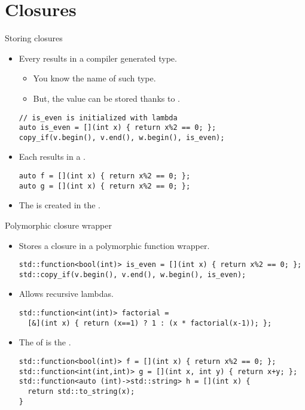 \section{Closures}

\begin{frame}[t,fragile]{Storing closures}
  \begin{itemize}
    \item Every  results in
          a  compiler generated type.
      \begin{itemize}
        \item You  know the name of such type.
        \item But, the value can be stored thanks to .
      \end{itemize}
\begin{lstlisting}
// is_even is initialized with lambda
auto is_even = [](int x) { return x%2 == 0; }; 
copy_if(v.begin(), v.end(), w.begin(), is_even);
\end{lstlisting}

    \item Each  results in a .
\begin{lstlisting}
auto f = [](int x) { return x%2 == 0; };
auto g = [](int x) { return x%2 == 0; };
\end{lstlisting}

    \item The  is created in the .
  \end{itemize}
\end{frame}

\begin{frame}[t,fragile]{Polymorphic closure wrapper}
  \begin{itemize}
    \item Stores a closure in a polymorphic function wrapper.
\begin{lstlisting}
std::function<bool(int)> is_even = [](int x) { return x%2 == 0; };
std::copy_if(v.begin(), v.end(), w.begin(), is_even);
\end{lstlisting}

    \item Allows recursive lambdas.
\begin{lstlisting}
std::function<int(int)> factorial = 
  [&](int x) { return (x==1) ? 1 : (x * factorial(x-1)); };
\end{lstlisting}

    \item The  of  
          is the .
\begin{lstlisting}
std::function<bool(int)> f = [](int x) { return x%2 == 0; };
std::function<int(int,int)> g = [](int x, int y) { return x+y; };
std::function<auto (int)->std::string> h = [](int x) { 
  return std::to_string(x); 
}
\end{lstlisting}
  \end{itemize}
\end{frame}
